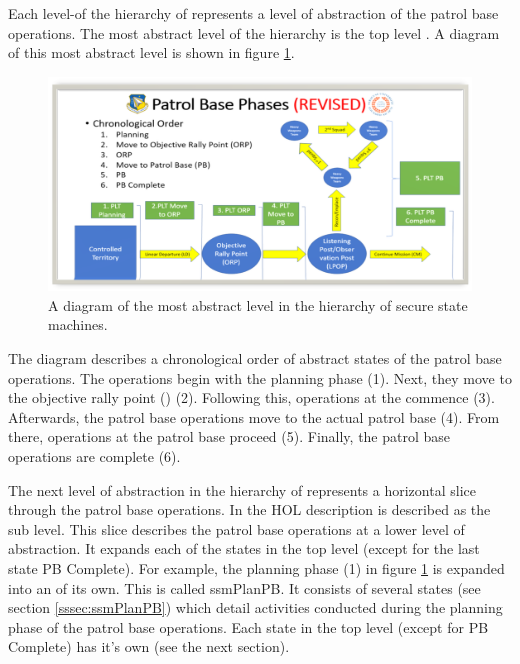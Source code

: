 \documentclass[../../main/main.tex]{subfiles}
\begin{document}
Each level-of the hierarchy of  represents a level of abstraction of the patrol base operations. The most abstract level of the hierarchy is the top level .  A diagram of this most abstract level is shown in figure \ref{pbtoplevel}.

\begin{figure}[h]
\includegraphics[width=\textwidth]{../figures/pbtoplevel}
\caption{\label{pbtoplevel}A diagram of the most abstract level in the hierarchy of secure state machines.}
\end{figure}

The diagram describes a chronological order of abstract states of the patrol base operations.  The operations begin with the planning phase (1).  Next, they move to the objective rally point () (2). Following this, operations at the  commence (3).  Afterwards, the patrol base operations move to the actual patrol base (4).  From there, operations at the patrol base proceed (5).  Finally, the patrol base operations are complete (6).  


The next level of abstraction in the hierarchy of  represents a horizontal slice through the patrol base operations.  In the HOL description is described as the sub level.  This slice describes the patrol base operations at a lower level of abstraction.  It expands each of the states in the top level (except for the last state PB Complete).  For example, the planning phase (1) in figure \ref{pbtoplevel} is expanded into an  of its own.  This is called ssmPlanPB.  It consists of several states (see section \ref{sssec:ssmPlanPB}) which detail activities conducted during the planning phase of the patrol base operations.  Each state in the top level (except for PB Complete) has it's own  (see the next section).
\end{document}
